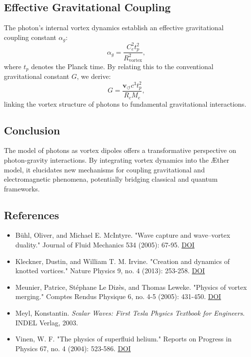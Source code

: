 \documentclass[a4paper,10pt]{article}
\begin{document}
    \subsection*{Effective Gravitational Coupling}
    The photon's internal vortex dynamics establish an effective gravitational coupling constant $\alpha_g$:
    \begin{equation*}
        \alpha_g = \frac{C_e^2 t_p^2}{R_\text{vortex}^2},
    \end{equation*}
    where $t_p$ denotes the Planck time. By relating this to the conventional gravitational constant $G$, we derive:
    \begin{equation*}
        G = \frac{\mathbf{v}_{\scriptscriptstyle\boldsymbol{\circlearrowleft}} c^3 t_p^2}{R_c M_e},
    \end{equation*}
    linking the vortex structure of photons to fundamental gravitational interactions.

    \subsection*{Conclusion}
    The model of photons as vortex dipoles offers a transformative perspective on photon-gravity interactions. By integrating vortex dynamics into the Æther model, it elucidates new mechanisms for coupling gravitational and electromagnetic phenomena, potentially bridging classical and quantum frameworks.

    \subsection*{References}
    \begin{itemize}
        \item Bühl, Oliver, and Michael E. McIntyre. "Wave capture and wave–vortex duality." Journal of Fluid Mechanics 534 (2005): 67-95. \href{https://doi.org/10.1017/S0022112005004374}{DOI}
        \item Kleckner, Dustin, and William T. M. Irvine. "Creation and dynamics of knotted vortices." Nature Physics 9, no. 4 (2013): 253-258. \href{https://doi.org/10.1038/nphys2560}{DOI}
        \item Meunier, Patrice, Stéphane Le Dizès, and Thomas Leweke. "Physics of vortex merging." Comptes Rendus Physique 6, no. 4-5 (2005): 431-450. \href{https://doi.org/10.1016/j.crhy.2005.06.003}{DOI}
        \item Meyl, Konstantin. \textit{Scalar Waves: First Tesla Physics Textbook for Engineers}. INDEL Verlag, 2003.
        \item Vinen, W. F. "The physics of superfluid helium." Reports on Progress in Physics 67, no. 4 (2004): 523-586. \href{https://doi.org/10.1088/0034-4885/67/4/R01}{DOI}
    \end{itemize}
\end{document}
